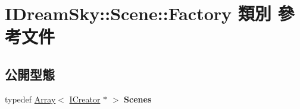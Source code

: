 \hypertarget{class_i_dream_sky_1_1_scene_1_1_factory}{}\section{I\+Dream\+Sky\+:\+:Scene\+:\+:Factory 類別 參考文件}
\label{class_i_dream_sky_1_1_scene_1_1_factory}
\subsection*{公開型態}
\begin{DoxyCompactItemize}
\item 
typedef \hyperlink{class_i_dream_sky_1_1_array}{Array}$<$ \hyperlink{class_i_dream_sky_1_1_scene_1_1_i_creator}{I\+Creator} $\ast$ $>$ {\bfseries Scenes}\hypertarget{class_i_dream_sky_1_1_scene_1_1_factory_a2c742957ff3d45be8c0b078f76785697}{}\label{class_i_dream_sky_1_1_scene_1_1_factory_a2c742957ff3d45be8c0b078f76785697}

\end{DoxyCompactItemize}
